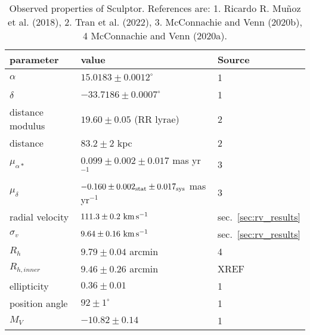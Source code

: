 \begin{table*}[t]
\centering
\caption[Observed Properties of Sculptor]{Observed properties of Sculptor. References are: 1. Ricardo R. Muñoz et al. (2018), 2. Tran et al. (2022), 3. McConnachie and Venn (2020b), 4 McConnachie and Venn (2020a). }
\label{tbl:scl_obs_props}
\begin{tabular}{lll}
\toprule
parameter & value & Source\\
\midrule
$\alpha$ & $15.0183 \pm 0.0012^\circ$ & 1\\
$\delta$ & $-33.7186 \pm 0.0007^\circ$ & 1\\
distance modulus & $19.60 \pm 0.05$ (RR lyrae) & 2\\
distance & $83.2 \pm 2$ kpc & 2\\
$\mu_{\alpha*}$ & $0.099 \pm 0.002 \pm 0.017$ mas yr$^{-1}$ & 3\\
$\mu_\delta$ & $-0.160 \pm 0.002_{\rm stat} \pm 0.017_{\rm sys}$ mas yr$^{-1}$ & 3\\
radial velocity & $111.3 \pm 0.2\ {\rm km\,s^{-1}}$ & sec. \ref{sec:rv_results}\\
$\sigma_v$ & $9.64\pm0.16\ {\rm km\,s^{-1}}$ & sec. \ref{sec:rv_results}\\
$R_h$ & $9.79 \pm 0.04$ arcmin & 4\\
$R_{h,inner}$ & $9.46 \pm 0.26$ arcmin & XREF\\
ellipticity & $0.36 \pm 0.01$ & 1\\
position angle & $92\pm1^\circ$ & 1\\
$M_V$ & $-10.82\pm0.14$ & 1\\
\bottomrule
\end{tabular}
\end{table*}

